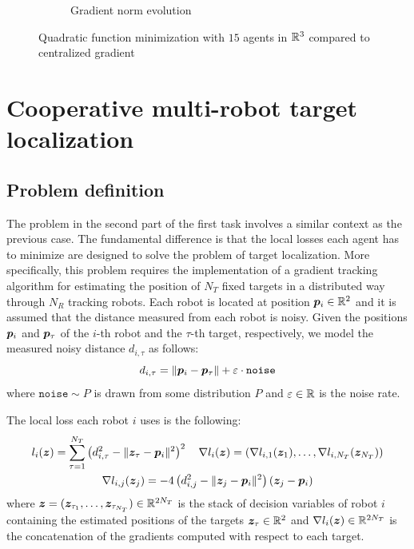 \documentclass[a4paper,11pt,oneside]{book}
\begin{document}
\begin{figure}[H]
\begin{subfigure}[t]{0.46\linewidth}
            \caption{Gradient norm evolution}
      \end{subfigure}
      \caption{Quadratic function minimization with $15$ agents in ${\mathbb{R}}^{3}$ compared to centralized gradient}
      \label{fig:quadratic_centralized_15_3}
\end{figure}



\chapter{Cooperative multi-robot target localization} \label{ch:localization}


\section{Problem definition}

The problem in the second part of the first task involves a similar context as the previous case. The fundamental difference is that the local losses each agent has to minimize are designed to solve the problem of target localization. More specifically, this problem requires the implementation of a gradient tracking algorithm for estimating the position of $N_T$ fixed targets in a distributed way through $N_R$ tracking robots. Each robot is located at position ${\bm{p}}_i \in {\mathbb{R}}^2$ and it is assumed that the distance measured from each robot is noisy. Given the positions ${\bm{p}}_i$ and ${\bm{p}}_\tau$ of the $i$-th robot and the $\tau$-th target, respectively, we model the measured noisy distance $d_{i,\tau}$ as follows:
\[
      d_{i,\tau} = \Vert {\bm{p}}_i - {\bm{p}}_\tau \Vert + \varepsilon \cdot \texttt{noise}
\]
where $\texttt{noise} \sim P$ is drawn from some distribution $P$ and $\varepsilon \in {\mathbb{R}}$ is the noise rate.

The local loss each robot $i$ uses is the following:
\[
      \begin{gathered}
            l_i({\bm{z}}) = \sum_{\tau=1}^{N_T} \left( d_{i,\tau}^2 - \Vert {\bm{z}}_{\tau} - {\bm{p}}_i \Vert^2 \right)^2
            \quad
            \nabla l_{i}({\bm{z}}) = (\nabla l_{i,1}({\bm{z}}_{1}), \dots, \nabla l_{i,N_T}({\bm{z}}_{N_T}))
            \\
            \nabla l_{i,j}({\bm{z}}_{j}) = -4 \left( d_{i,j}^2 - \Vert {\bm{z}}_{j} - {\bm{p}}_i \Vert^2 \right) \left( {\bm{z}}_{j} - {\bm{p}}_i \right)
      \end{gathered}
\]
where ${\bm{z}} = ({\bm{z}}_{\tau_1}, \dots, {\bm{z}}_{\tau_{N_T}}) \in {\mathbb{R}}^{2N_T}$ is the stack of decision variables of robot $i$ containing the estimated positions of the targets ${\bm{z}}_{\tau} \in {\mathbb{R}}^2$ and $\nabla l_i({\bm{z}}) \in {\mathbb{R}}^{2N_T}$ is the concatenation of the gradients computed with respect to each target.
\end{document}
